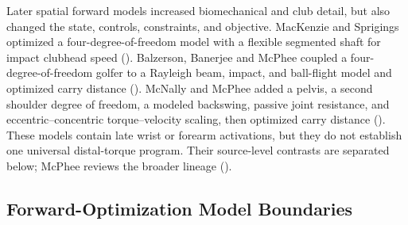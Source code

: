 \documentclass[
  letterpaper,
]{report}
\begin{document}
Later spatial forward models increased biomechanical and club detail,
but also changed the state, controls, constraints, and objective.
MacKenzie and Sprigings optimized a four-degree-of-freedom model with a
flexible segmented shaft for impact clubhead speed
(). Balzerson,
Banerjee and McPhee coupled a four-degree-of-freedom golfer to a
Rayleigh beam, impact, and ball-flight model and optimized carry
distance (). McNally and McPhee added a pelvis, a second shoulder degree of
freedom, a modeled backswing, passive joint resistance, and
eccentric--concentric torque--velocity scaling, then optimized carry
distance (). These
models contain late wrist or forearm activations, but they do not
establish one universal distal-torque program. Their source-level
contrasts are separated below; McPhee reviews the broader lineage
().

\subsection{Forward-Optimization Model
Boundaries}\label{forward-optimization-model-boundaries}
\end{document}
